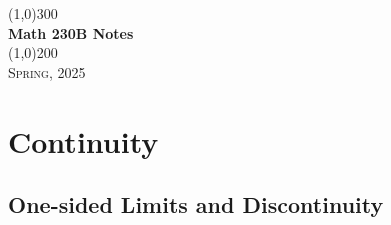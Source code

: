 \documentclass[a4paper, openany]{book}
\begin{document}
\begin{titlepage}
    \begin{center}
        \line(1,0){300} \\
        [0.25in]
        \huge{\bfseries Math 230B Notes} \\
        [2mm]
        \line(1,0){200} \\
        [1.5cm]
        \textsc{\LARGE Spring, 2025}
    \end{center}
\end{titlepage}

\tableofcontents
\setcounter{section}{0}

\chapter{Continuity}

\section{One-sided Limits and Discontinuity}
\newpage
\end{document}
